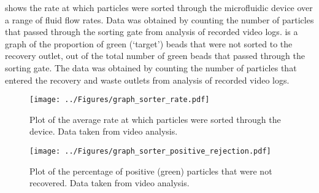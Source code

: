  shows the rate at which particles were sorted through the microfluidic device over a range of fluid flow rates. Data was obtained by counting the number of particles that passed through the sorting gate from analysis of recorded video logs.  is a graph of the proportion of green (`target') beads that were not sorted to the recovery outlet, out of the total number of green beads that passed through the sorting gate. The data was obtained by counting the number of particles that entered the recovery and waste outlets from analysis of recorded video logs. 

\begin{figure}
 \centering
 \texttt{[image: ../Figures/graph\_sorter\_rate.pdf]}
 \caption[Plot of the average rate at which particles were sorted through the device.]{Plot of the average rate at which particles were sorted through the device. Data taken from video analysis.}
 \label{fig:graph_sorter_rate}
\end{figure}


\begin{figure}
 \centering
 \texttt{[image: ../Figures/graph\_sorter\_positive\_rejection.pdf]}
 \caption[Plot of the percentage of positive (green) particles that were not recovered.]{Plot of the percentage of positive (green) particles that were not recovered. Data taken from video analysis.}
 \label{fig:graph_sorter_positive_rejection}
\end{figure}



